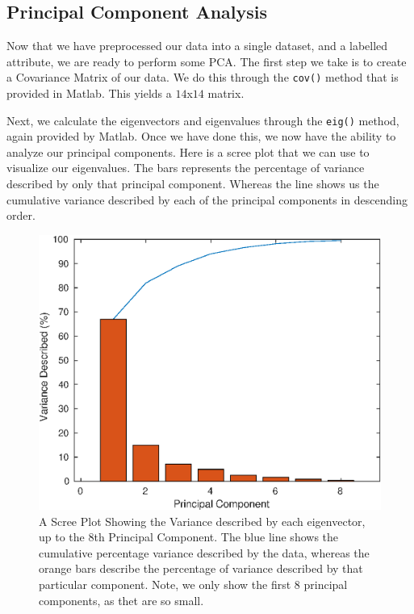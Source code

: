 \documentclass{article}
\begin{document}
\subsection{Principal Component Analysis}
Now that we have preprocessed our data into a single dataset, and a labelled attribute, we are ready to perform some PCA. The first step we take is to create a Covariance Matrix of our data. We do this through the \texttt{cov()} method that is provided in Matlab. This yields a $14$x$14$ matrix. 
\vspace{3mm}

Next, we calculate the eigenvectors and eigenvalues through the \texttt{eig()} method, again provided by Matlab. Once we have done this, we now have the ability to analyze our principal components. Here is a scree plot that we can use to visualize our eigenvalues. The bars represents the percentage of variance described  by only that principal component. Whereas the line shows us the cumulative variance described by each of the principal components in descending order.

\begin{figure}[H]
\centering
\caption{A Scree Plot Showing the Variance described by each eigenvector, up to the 8th Principal Component. The blue line shows the cumulative percentage variance described by the data, whereas the orange bars describe the percentage of variance described by that particular component. Note, we only show the first 8 principal components, as thet are so small.}
\includegraphics[scale = 0.75]{main/scree_plot.eps}
\end{figure}
\end{document}
